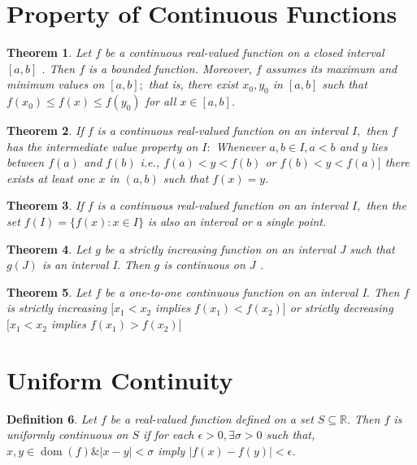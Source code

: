 \documentclass[12pt]{article}
\newtheorem{theorem}{Theorem}[section]
\newtheorem{definition}[theorem]{Definition}
\begin{document}
\section{Property of Continuous Functions}
\begin{theorem}
	Let $f$ be a continuous real-valued function on a closed interval $[ a , b ]$ .
	Then $f$ is a bounded function. Moreover, $f$ assumes its maximum
	and minimum values on $[ a , b ] ;$ that is, there exist $x _ { 0 } , y _ { 0 }$ in $[ a , b ]$ such that $f(x_0) \leq f(x) \leq f(y_0)$ for all $x \in [a, b]$.
\end{theorem}
\begin{theorem}
	If $f$ is a continuous real-valued function on an interval $I ,$ then $f$ has
	the intermediate value property on $I :$ Whenever $a , b \in I , a < b$ and $y$ lies between $f ( a )$ and $f ( b )$ i.e., $f ( a ) < y < f ( b )$ or $f ( b ) < y < f ( a ) ]$
	there exists at least one $x$ in $( a , b )$ such that $f ( x ) = y .$
\end{theorem}

\begin{theorem}
	If $f$ is a continuous real-valued function on an interval $I ,$ then the
	set $f ( I ) = \{ f ( x ) : x \in I \}$ is also an interval or a single point.
\end{theorem}

\begin{theorem}
	Let $g$ be a strictly increasing function on an interval J such that $g ( J )$
	is an interval I. Then $g$ is continuous on $J$ .
\end{theorem}

\begin{theorem}
	Let $f$ be a one-to-one continuous function on an interval I. Then
	$f$ is strictly increasing $[ x _ { 1 } < x _ { 2 }$ implies $f \left( x _ { 1 } \right) < f \left( x _ { 2 } \right) ]$ or strictly
	decreasing $[ x _ { 1 } < x _ { 2 }$ implies $f \left( x _ { 1 } \right) > f \left( x _ { 2 } \right) ]$
\end{theorem}
\section{Uniform Continuity}
\begin{definition}
	Let $f$ be a real-valued function defined on a set $S \subseteq \mathbb { R } .$ Then $f$ is
	uniformly continuous on $S$ if for each $\epsilon > 0, \exists \sigma > 0$ such that, $x, y \in \operatorname{dom}(f) \& |x - y| < \sigma$ imply $|f(x) - f(y)|< \epsilon$.
\end{definition}
\end{document}
